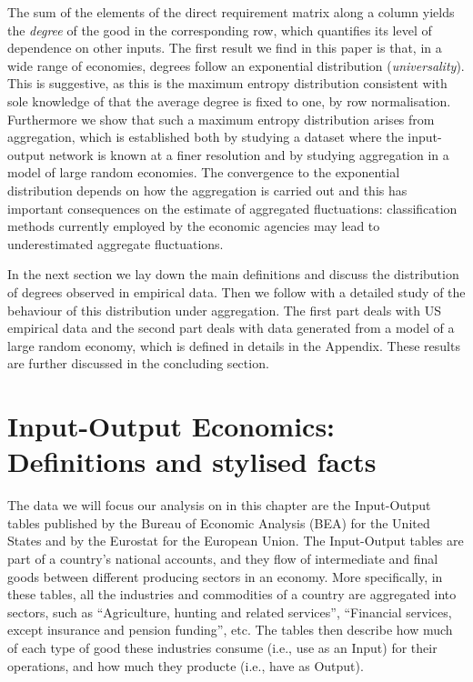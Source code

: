 The sum of the elements of the direct requirement matrix along a
column yields the {\em degree} of the good in the corresponding row,
which quantifies its level of dependence on other inputs.  The first
result we find in this paper is that, in a wide range of economies,
degrees follow an exponential distribution ({\em universality}). This
is suggestive, as this is the maximum entropy distribution consistent
with sole knowledge of that the average degree is fixed to one, by row
normalisation.  Furthermore we show that such a maximum entropy
distribution arises from aggregation, which is established both by
studying a dataset where the input-output network is known at a finer
resolution and by studying aggregation in a model of large random
economies.  The convergence to the exponential distribution depends on
how the aggregation is carried out and this has important consequences
on the estimate of aggregated fluctuations: classification methods
currently employed by the economic agencies may lead to underestimated
aggregate fluctuations.

In the next section we lay down the main definitions and discuss the
distribution of degrees observed in empirical data.  Then we follow
with a detailed study of the behaviour of this distribution under
aggregation. The first part deals with US empirical data and the
second part deals with data generated from a model of a large random
economy, which is defined in details in the Appendix.  These results
are further discussed in the concluding section.

\section{Input-Output Economics: Definitions and stylised facts}
\label{sec:IO}

The data we will focus our analysis on in this chapter are the Input-Output tables published by
the Bureau of Economic Analysis (BEA) for the United States and by the
Eurostat for the European Union. The Input-Output tables are part of a country's national accounts, and they flow of intermediate and final goods between different producing sectors in an economy. More specifically, in these tables, all the industries
and commodities of a country are aggregated into sectors, such as
``Agriculture, hunting and related services'', ``Financial services,
except insurance and pension funding'', etc. The tables then describe how much of each type of good these industries consume (i.e., use as an Input) for their operations, and how much they producte (i.e., have as Output). 

